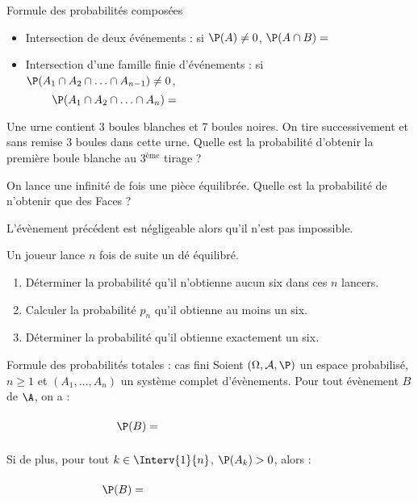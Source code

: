 \documentclass[a4paper,10pt]{report}
\begin{document}
\begin{enumerate}
\begin{Theoreme}{Formule des probabilités composées}
 \begin{itemize}
  \item Intersection de deux événements : si $\P(A) \ne 0$, $\P(A\cap B) = $
  \item Intersection d'une famille finie d'événements : si $\P(A_1 \cap A_2 \cap \ldots \cap A_{n-1}) \neq 0$,
   $$\P(A_1 \cap A_2 \cap \ldots \cap A_n)= \qquad \qquad \qquad \phantom{ahahaaaaaaaaaaaa bla bla bla}$$
 \end{itemize}
\end{Theoreme}

\begin{Exemple} Une urne contient 3 boules blanches et 7 boules noires. On tire successivement et sans remise 3 boules dans cette urne. Quelle est la probabilité d'obtenir la première boule blanche au 3$^{\text{ème}}$ tirage ?

\vspace{4cm}
\end{Exemple}


\begin{Exemple} On lance une infinité de fois une pièce équilibrée. Quelle est la probabilité de n'obtenir que des Faces ?

\vspace{5cm}
\end{Exemple}


\begin{Remarque}{} L'évènement précédent est négligeable alors qu'il n'est pas impossible.
\end{Remarque}

\begin{ApplicationDirecte} Un joueur lance $n$ fois de suite un dé équilibré.
 \begin{enumerate}
  \item Déterminer la probabilité qu'il n'obtienne aucun six dans ces $n$ lancers.
  \item Calculer la probabilité $p_n$ qu'il obtienne au moins un six.
  \item Déterminer la probabilité qu'il obtienne exactement un six.
 \end{enumerate}
 \end{ApplicationDirecte}
 
\begin{Theoreme}{Formule des probabilités totales : cas fini}
Soient $(\Omega, \mathcal{A}, \P)$ un espace probabilisé, $n \geq 1$ et $(A_1, \ldots, A_n)$ un système complet d'évènements. Pour tout évènement $B$ de $\A$, on a :
$$ \P(B) = \phantom{blabbbbbbbbbbb\sum_{k=1}^n P(A_k \cap B)}$$
Si de plus, pour tout $k \in \Interv{1}{n}$, $\P(A_k) >0$, alors :
$$\P(B) = \phantom{blabbbbbbbbbbb \sum_{k=1}^n P(A_k) \times P_{A_k}(B)} $$
\end{Theoreme}



\end{enumerate}
\end{document}

